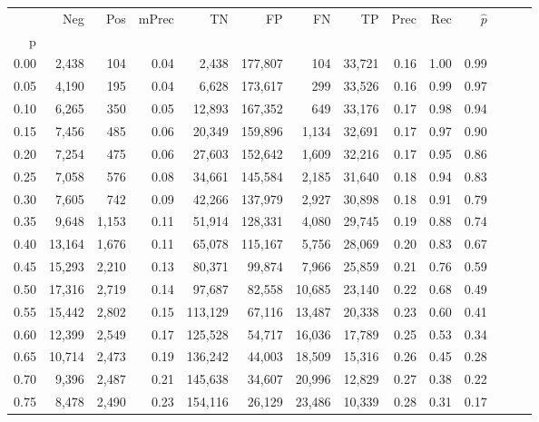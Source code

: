 \begin{tabular}{rrrrrrrrrrrrrr}
\toprule
{} &     Neg &    Pos & mPrec &       TN &       FP &      FN &      TP &  Prec &   Rec & $\hat{p}$ \\
p    &         &        &       &          &          &         &         &       &       &           \\
\midrule
0.00 &   2,438 &    104 &  0.04 &    2,438 &  177,807 &     104 &  33,721 &  0.16 &  1.00 &      0.99 \\
0.05 &   4,190 &    195 &  0.04 &    6,628 &  173,617 &     299 &  33,526 &  0.16 &  0.99 &      0.97 \\
0.10 &   6,265 &    350 &  0.05 &   12,893 &  167,352 &     649 &  33,176 &  0.17 &  0.98 &      0.94 \\
0.15 &   7,456 &    485 &  0.06 &   20,349 &  159,896 &   1,134 &  32,691 &  0.17 &  0.97 &      0.90 \\
0.20 &   7,254 &    475 &  0.06 &   27,603 &  152,642 &   1,609 &  32,216 &  0.17 &  0.95 &      0.86 \\
0.25 &   7,058 &    576 &  0.08 &   34,661 &  145,584 &   2,185 &  31,640 &  0.18 &  0.94 &      0.83 \\
0.30 &   7,605 &    742 &  0.09 &   42,266 &  137,979 &   2,927 &  30,898 &  0.18 &  0.91 &      0.79 \\
0.35 &   9,648 &  1,153 &  0.11 &   51,914 &  128,331 &   4,080 &  29,745 &  0.19 &  0.88 &      0.74 \\
0.40 &  13,164 &  1,676 &  0.11 &   65,078 &  115,167 &   5,756 &  28,069 &  0.20 &  0.83 &      0.67 \\
0.45 &  15,293 &  2,210 &  0.13 &   80,371 &   99,874 &   7,966 &  25,859 &  0.21 &  0.76 &      0.59 \\
0.50 &  17,316 &  2,719 &  0.14 &   97,687 &   82,558 &  10,685 &  23,140 &  0.22 &  0.68 &      0.49 \\
0.55 &  15,442 &  2,802 &  0.15 &  113,129 &   67,116 &  13,487 &  20,338 &  0.23 &  0.60 &      0.41 \\
0.60 &  12,399 &  2,549 &  0.17 &  125,528 &   54,717 &  16,036 &  17,789 &  0.25 &  0.53 &      0.34 \\
0.65 &  10,714 &  2,473 &  0.19 &  136,242 &   44,003 &  18,509 &  15,316 &  0.26 &  0.45 &      0.28 \\
0.70 &   9,396 &  2,487 &  0.21 &  145,638 &   34,607 &  20,996 &  12,829 &  0.27 &  0.38 &      0.22 \\
0.75 &   8,478 &  2,490 &  0.23 &  154,116 &   26,129 &  23,486 &  10,339 &  0.28 &  0.31 &      0.17 \\

\end{tabular}

